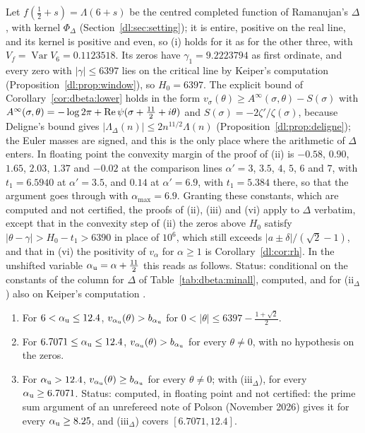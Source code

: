 \begin{remark}\label{bp:rem:deltacol}
Let $f(\frac12+s)=\Lambda(6+s)$ be the centred completed function of Ramanujan's $\Delta$, with kernel $\Phi_\Delta$ (Section~\ref{dl:sec:setting}); it is entire, positive on the real line, and its kernel is positive and even, so (i) holds for it as for the other three, with $V_f=\operatorname{Var}V_6=0.1123518$. Its zeros have $\gamma_1=9.2223794$ as first ordinate, and every zero with $|\gamma|\le6397$ lies on the critical line by Keiper's computation (Proposition~\ref{dl:prop:window}), so $H_0=6397$. The explicit bound of Corollary~\ref{cor:dbeta:lower} holds in the form $v_\sigma(\theta)\ge A^\infty(\sigma,\theta)-S(\sigma)$ with $A^\infty(\sigma,\theta)=-\log2\pi+\operatorname{Re}\psi(\sigma+\frac{11}2+i\theta)$ and $S(\sigma)=-2\zeta'/\zeta(\sigma)$, because Deligne's bound gives $|\Lambda_\Delta(n)|\le2n^{11/2}\Lambda(n)$ (Proposition~\ref{dl:prop:deligne}); the Euler masses are signed, and this is the only place where the arithmetic of $\Delta$ enters. In floating point the convexity margin of the proof of (ii) is $-0.58$, $0.90$, $1.65$, $2.03$, $1.37$ and $-0.02$ at the comparison lines $\alpha'=3$, $3.5$, $4$, $5$, $6$ and $7$, with $t_1=6.5940$ at $\alpha'=3.5$, and $0.14$ at $\alpha'=6.9$, with $t_1=5.384$ there, so that the argument goes through with $\alpha_{\max}=6.9$. Granting these constants, which are computed and not certified, the proofs of (ii), (iii) and (vi) apply to $\Delta$ verbatim, except that in the convexity step of (ii) the zeros above $H_0$ satisfy $|\theta-\gamma|>H_0-t_1>6390$ in place of $10^6$, which still exceeds $|a\pm\delta|/(\sqrt2-1)$, and that in (vi) the positivity of $v_\alpha$ for $\alpha\ge1$ is Corollary~\ref{dl:cor:rh}. In the unshifted variable $\alpha_{\rm u}=\alpha+\frac{11}2$ this reads as follows. Status: conditional on the constants of the column for $\Delta$ of Table~\ref{tab:dbeta:minall}, computed, and for (ii$_\Delta$) also on Keiper's computation \cite{NCKeiper96}.
\begin{enumerate}
\item[(ii$_\Delta$)] For $6<\alpha_{\rm u}\le12.4$, $v_{\alpha_{\rm u}}(\theta)>b_{\alpha_{\rm u}}$ for $0<|\theta|\le6397-\frac{1+\sqrt2}2$.
\item[(iii$_\Delta$)] For $6.7071\le\alpha_{\rm u}\le12.4$, $v_{\alpha_{\rm u}}(\theta)>b_{\alpha_{\rm u}}$ for every $\theta\ne0$, with no hypothesis on the zeros.
\item[(iv$_\Delta$)] For $\alpha_{\rm u}>12.4$, $v_{\alpha_{\rm u}}(\theta)\ge b_{\alpha_{\rm u}}$ for every $\theta\ne0$; with (iii$_\Delta$), for every $\alpha_{\rm u}\ge6.7071$. Status: computed, in floating point and not certified: the prime sum argument of an unrefereed note of Polson (November 2026) gives it for every $\alpha_{\rm u}\ge8.25$, and (iii$_\Delta$) covers $[6.7071,12.4]$.

\end{enumerate}
\end{remark}
